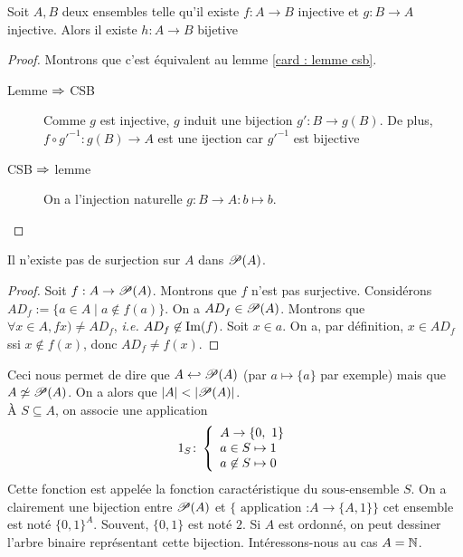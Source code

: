 \begin{theoreme}
    Soit $A,B$ deux ensembles telle qu'il existe $f:A\to B$ injective et $g:B\to A$ injective. Alors il existe $h:A\to B$ bijetive
\end{theoreme}
\begin{proof}
    Montrons que c'est équivalent au lemme \ref{card : lemme csb}.
    \begin{description}
        \item[Lemme $\Rightarrow$ CSB] Comme $g$ est injective, $g$ induit une bijection $g': B\to g(B)$. De plus, $f\circ g'^{-1}: g(B)\to A$ est une ijection car $g'^{-1}$ est bijective
        \item[CSB $\Rightarrow$ lemme] On a l'injection naturelle $g:B\to A : b\mapsto b$.
    \end{description}
\end{proof}

\begin{theoreme}[Cantor]
Il n'existe pas de surjection sur $A$ dans $\mathscr{P}(A)$. 
\end{theoreme}
\begin{proof}
Soit $f: A\to\mathscr{P}(A)$. Montrons que $f$ n'est pas surjective. Considérons $AD_f:=\{a\in A\mid a\not\in f(a)\}$. On a $AD_f\in\mathscr{P}(A)$. Montrons que $\forall x\in A, fx)\ne AD_f$, \textit{i.e.} $AD_f\not\in\operatorname{Im}(f)$. Soit $x\in a$. On a, par définition, $x\in AD_f$ ssi $x\not\in f(x)$, donc $AD_f\ne f(x)$.
\end{proof}

\begin{remarque}
    
Ceci nous permet de dire que $A\hookleftarrow\mathscr{P}(A)$ (par $a\mapsto \{a\}$ par exemple) mais que $A\not\simeq \mathscr{P}(A)$. On a alors que $\left| A \right| <\left| \mathscr{P}(A) \right|$.\\
À $S\subseteq A$, on associe une application $$1_S\colon \left\{\begin{array}{l}A\to\{0,\ 1\} \\a\in S\mapsto 1\\ a\not\in S\mapsto 0\end{array}\right.$$ Cette fonction est appelée la fonction caractéristique du sous-ensemble $S$. On a clairement une bijection entre $\mathscr{P}(A)$ et $\{\text{ application :} A\to \{A,1\}\}$ cet ensemble est noté $\{0,1\}^A$. Souvent, $\{0,1\}$ est noté $2$. Si $A$ est ordonné, on peut dessiner l'arbre binaire représentant cette bijection. Intéressons-nous au cas $A=\mathbb{N}$.
\end{remarque}


